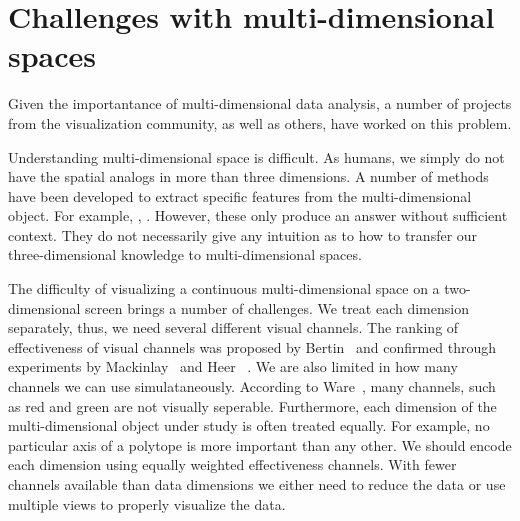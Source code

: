 
\section{Challenges with multi-dimensional spaces}
\label{sec:multi-d-challenges}

Given the importantance of multi-dimensional data analysis, a number of
projects from the visualization community, as well as others, have worked on
this problem. 


Understanding multi-dimensional space is difficult. As humans, we simply do 
not have the spatial analogs in more than three dimensions. A number of methods
have been developed to extract specific features from the multi-dimensional
object. For example, , .
However, these only produce an answer without sufficient context. They do not 
necessarily give any intuition as to how to transfer our three-dimensional
knowledge to multi-dimensional spaces.



The difficulty of visualizing a continuous multi-dimensional space on a
two-dimensional screen brings a number of challenges. We treat each dimension
separately, thus, we need several different visual channels. The ranking of
effectiveness of visual channels was proposed by Bertin~\cite{Bertin:1967} and
confirmed through experiments by Mackinlay~\cite{Mackinlay:1986} and
Heer~\cite{Heer} . We are also limited in how many channels we
can use simulataneously. According to Ware~\cite{Ware}, many channels, such as
red and green are not visually seperable. Furthermore, each dimension of the
multi-dimensional object under study is often treated equally. For example, no
particular axis of a polytope is more important than any other.  We should
encode each dimension using equally weighted effectiveness channels.  With
fewer channels available than data dimensions we either need to reduce the data
or use multiple views to properly visualize the data.



